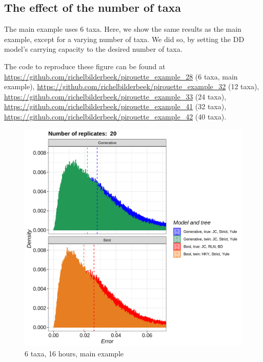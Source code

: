\subsection{The effect of the number of taxa}
\label{subsec:n_taxa}

The main example uses 6 taxa. Here, we show the same results as the main example,
except for a varying number of taxa. We did so, by setting the DD model's
carrying capacity to the desired number of taxa.

The code to reproduce these figure can be found at  
\url{https://github.com/richelbilderbeek/pirouette_example_28} (6 taxa, main example),
\url{https://github.com/richelbilderbeek/pirouette_example_32} (12 taxa),
\url{https://github.com/richelbilderbeek/pirouette_example_33} (24 taxa),
\url{https://github.com/richelbilderbeek/pirouette_example_41} (32 taxa),
\url{https://github.com/richelbilderbeek/pirouette_example_42} (40 taxa). 

\begin{figure}[H]
  \includegraphics[width=\textwidth]{pirouette_example_28/errors.png}
  \caption{6 taxa, 16 hours, main example}
\end{figure}

